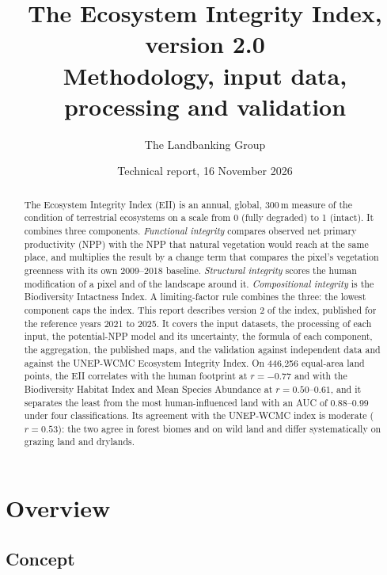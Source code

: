 \documentclass[11pt,a4paper]{article}
\title{\textbf{The Ecosystem Integrity Index, version 2.0}\\[4pt]
\large Methodology, input data, processing and validation}
\author{The Landbanking Group}
\date{Technical report, 16 November 2026}
\begin{document}
\maketitle

\begin{abstract}
\noindent
The Ecosystem Integrity Index (EII) is an annual, global, 300\,m measure of the condition of
terrestrial ecosystems on a scale from 0 (fully degraded) to 1 (intact). It combines three
components. \emph{Functional integrity} compares observed net primary productivity (NPP) with
the NPP that natural vegetation would reach at the same place, and multiplies the result by a
change term that compares the pixel's vegetation greenness with its own 2009--2018 baseline.
\emph{Structural integrity}
scores the human modification of a pixel and of the landscape around it.
\emph{Compositional integrity} is the Biodiversity Intactness Index. A limiting-factor rule
combines the three: the lowest component caps the index. This report describes version 2 of the
index, published for the reference years 2021 to 2025. It covers the input datasets, the
processing of each input, the potential-NPP model and its uncertainty, the formula of each
component, the aggregation, the published maps, and the validation against independent data and
against the UNEP-WCMC Ecosystem Integrity Index. On 446,256 equal-area land points, the EII
correlates with the human footprint at $r = -0.77$ and with the Biodiversity Habitat Index and
Mean Species Abundance at $r = 0.50$--$0.61$, and it separates the least from the most
human-influenced land with an AUC of 0.88--0.99 under four classifications. Its agreement with
the UNEP-WCMC index is moderate ($r = 0.53$): the two agree in forest biomes and on wild land
and differ systematically on grazing land and drylands.
\end{abstract}

\tableofcontents
\newpage

\section{Overview}

\subsection{Concept}
\end{document}
